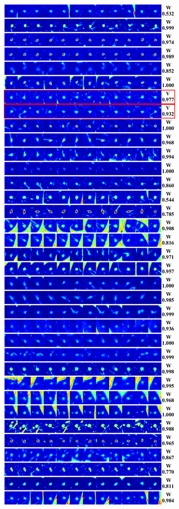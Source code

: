 \documentclass[onecolumn]{IEEEtran}
\begin{document}
\begin{figure}[H]
{\includegraphics[width=0.45\columnwidth]{./images/lidc-colornodules-iso1}
}
\end{figure}
\end{document}
